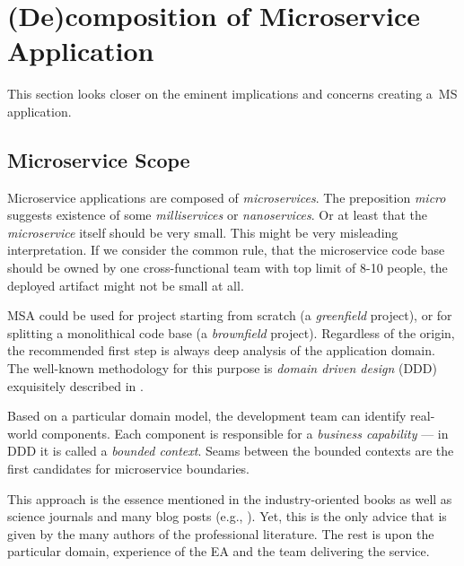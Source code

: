 \documentclass[thesis=M,english,hidelinks]{FITthesis}[2012/10/20]
\begin{document}
\section{(De)composition of Microservice Application}

This section looks closer on the eminent implications and concerns creating a~\acrlong{MS} application.

\subsection{Microservice Scope}
Microservice applications are composed of \textit{microservices}. The preposition \textit{micro} suggests existence of some \textit{milliservices} or \textit{nanoservices}. Or at least that the \textit{microservice} itself should be very small. This might be very misleading interpretation. If we consider the common rule, that the microservice code base should be owned by one cross-functional team \cite{ms-building-ms, ms-evolutionary-arch, ms-fow-new-term-def} with top limit of 8-10 people, the deployed artifact might not be small at all.

\acrshort{MSA} could be used for project starting from scratch (a \textit{greenfield} project), or for splitting a monolithical code base (a \textit{brownfield} project). Regardless of the origin, the recommended first step is always deep analysis of the application domain. The well-known methodology for this purpose is \textit{domain driven design} (\acrshort{DDD}) exquisitely described in \cite{domain-driven-design}.

Based on a particular domain model, the development team can identify real-world components. Each component is responsible for a \textit{business capability} --- in \acrshort{DDD} it is called a \textit{bounded context}. Seams between the bounded contexts are the first candidates for microservice boundaries.

This approach is the essence mentioned in the industry-oriented books \cite{ms-building-ms, ms-evolutionary-arch, ms-patterns, ms-ca} as well as science journals \cite{ms-integrating-with-adaptable-ea, ms-towards-integrated-soa, ms-design-tradeoffs, ms-approaches-to-soa-evolution, ms-self-managing} and many blog posts (e.g., \cite{ms-fow-new-term-def, ms-modelling-with-petter}). Yet, this is the only advice that is given by the many authors of the professional literature. The rest is upon the particular domain, experience of the \acrlong{EA} and the team delivering the service. 
\end{document}
